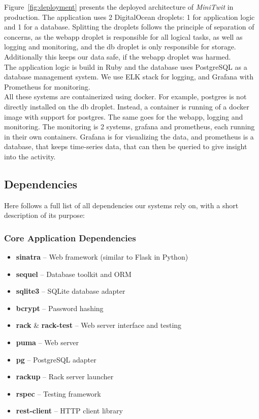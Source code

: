 Figure~\ref{fig:deployment} presents the deployed architecture of \textit{MiniTwit} in production. The application uses 2 DigitalOcean droplets: 1 for application logic and 1 for a database. Splitting the droplets follows the principle of separation of concerns, as the webapp droplet is responsible for all logical tasks, as well as logging and monitoring, and the db droplet is only responsible for storage. Additionally this keeps our data safe, if the webapp droplet was harmed. \\

The application logic is build in Ruby and the database uses PostgreSQL as a database management system. We use ELK stack for logging, and Grafana with Prometheus for monitoring. \\

All these systems are containerized using docker. For example, postgres is not directly installed on the db droplet. Instead, a container is running of a docker image with support for postgres. The same goes for the webapp, logging and monitoring. The monitoring is 2 systems, grafana and prometheus, each running in their own containers. Grafana is for visualizing the data, and prometheus is a database, that keeps time-series data, that can then be queried to give insight into the activity. \\


\subsection{Dependencies}

Here follows a full list of all dependencies our systems rely on, with a short description of its purpose:

\subsubsection{Core Application Dependencies}
\begin{itemize}
    \item \textbf{sinatra} -- Web framework (similar to Flask in Python)
    \item \textbf{sequel} -- Database toolkit and ORM
    \item \textbf{sqlite3} -- SQLite database adapter
    \item \textbf{bcrypt} -- Password hashing
    \item \textbf{rack} \& \textbf{rack-test} -- Web server interface and testing
    \item \textbf{puma} -- Web server
    \item \textbf{pg} -- PostgreSQL adapter
    \item \textbf{rackup} -- Rack server launcher
    \item \textbf{rspec} -- Testing framework
    \item \textbf{rest-client} -- HTTP client library
\end{itemize}

